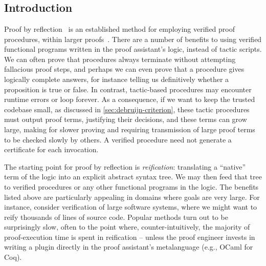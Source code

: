 \chapter{}\label{ch:reflection}

\section{Introduction}\label{sec:reflection:intro}\label{sec:reification-by-parametricity:intro:old}


Proof by reflection~\cite{ReflectionTACS97} is an established method for employing verified proof procedures, within larger proofs~\cite{MirrorShardITP14,malecha2013mirror-shard,Speeding2017Malecha,gonthier2016small}.
There are a number of benefits to using verified functional programs written in the proof assistant's logic, instead of tactic scripts.
We can often prove that procedures always terminate without attempting fallacious proof steps, and perhaps we can even prove that a procedure gives logically complete answers, for instance telling us definitively whether a proposition is true or false.
In contrast, tactic-based procedures may encounter runtime errors or loop forever.
As a consequence, if we want to keep the trusted codebase small, as discussed in \autoref{sec:debruijn-criterion}, these tactic procedures must output proof terms, justifying their decisions, and these terms can grow large, making for slower proving and requiring transmission of large proof terms to be checked slowly by others.
A verified procedure need not generate a certificate for each invocation.

The starting point for proof by reflection is \emph{reification}: translating a ``native'' term of the logic into an explicit abstract syntax tree.
We may then feed that tree to verified procedures or any other functional programs in the logic.
The benefits listed above are particularly appealing in domains where goals are very large.
For instance, consider verification of large software systems, where we might want to reify thousands of lines of source code.
Popular methods turn out to be surprisingly slow, often to the point where, counter-intuitively, the majority of proof-execution time is spent in reification -- unless the proof engineer invests in writing a plugin directly in the proof assistant's metalanguage (e.g., OCaml for Coq).

